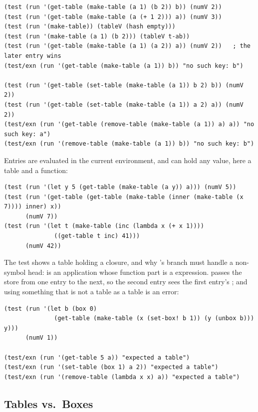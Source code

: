 \begin{lstlisting}
(test (run '(get-table (make-table (a 1) (b 2)) b)) (numV 2))
(test (run '(get-table (make-table (a (+ 1 2))) a)) (numV 3))
(test (run '(make-table)) (tableV (hash empty)))
(test (run '(make-table (a 1) (b 2))) (tableV t-ab))
(test (run '(get-table (make-table (a 1) (a 2)) a)) (numV 2))   ; the later entry wins
(test/exn (run '(get-table (make-table (a 1)) b)) "no such key: b")

(test (run '(get-table (set-table (make-table (a 1)) b 2) b)) (numV 2))
(test (run '(get-table (set-table (make-table (a 1)) a 2) a)) (numV 2))
(test/exn (run '(get-table (remove-table (make-table (a 1)) a) a)) "no such key: a")
(test/exn (run '(remove-table (make-table (a 1)) b)) "no such key: b")
\end{lstlisting}
Entries are evaluated in the current environment, and can hold any value, here a table and a function:
\begin{lstlisting}
(test (run '(let y 5 (get-table (make-table (a y)) a))) (numV 5))
(test (run '(get-table (get-table (make-table (inner (make-table (x 7)))) inner) x))
      (numV 7))
(test (run '(let t (make-table (inc (lambda x (+ x 1))))
              ((get-table t inc) 41)))
      (numV 42))
\end{lstlisting}
The  test shows a table holding a closure, and why 's  branch must handle a non-symbol head:  is an application whose function part is a  expression.  passes the store from one entry to the next, so the second entry sees the first entry's ; and using something that is not a table as a table is an error:
\begin{lstlisting}
(test (run '(let b (box 0)
              (get-table (make-table (x (set-box! b 1)) (y (unbox b))) y)))
      (numV 1))

(test/exn (run '(get-table 5 a)) "expected a table")
(test/exn (run '(set-table (box 1) a 2)) "expected a table")
(test/exn (run '(remove-table (lambda x x) a)) "expected a table")
\end{lstlisting}

\subsection{Tables vs.\ Boxes}
\label{sec:rec6-vs}

